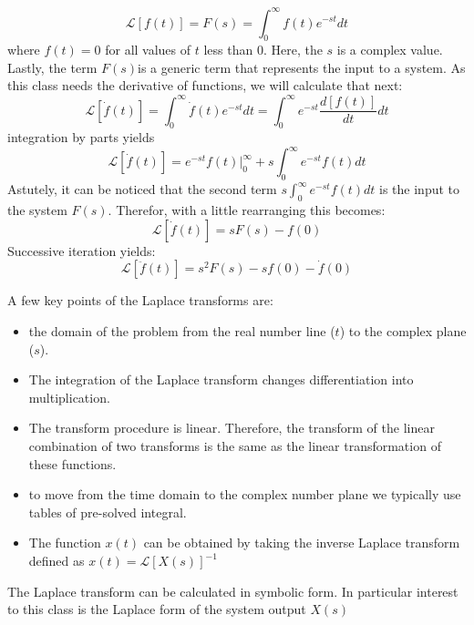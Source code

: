 \documentclass[12pt,letter]{article}
\numberwithin{ex}{section} %
\newcommand{\Laplace}[1]{\ensuremath{\mathcal{L}{\left[#1\right]}}}
\begin{document}
		\begin{equation}
				\Laplace{f(t)} = F(s) = \int_{0}^{\infty} f(t)e^{-st}dt
		\end{equation}
		where $f(t)=0$ for all values of $t$ less than 0. Here, the $s$ is a complex value. Lastly, the term $F(s)$is a generic term that  represents the input to a system. As this class needs the derivative of functions, we will calculate that next:
		\begin{equation}
			\Laplace{\dot{f}(t)} = \int_{0}^{\infty} \dot{f}(t)e^{-st}dt = \int_{0}^{\infty} e^{-st}\frac{d[f(t)]}{dt}dt 
		\end{equation}		
		integration by parts yields
		\begin{equation}
			\Laplace{\dot{f}(t)} = e^{-st}f(t)\Big|_0^\infty+s\int_{0}^{\infty}e^{-st}f(t)dt
		\end{equation}
		Astutely, it can be noticed that the second term $s\int_{0}^{\infty}e^{-st}f(t)dt$
		is the input to the system $F(s)$. Therefor, with a little rearranging this becomes:
		\begin{equation}
			\Laplace{\dot{f}(t)} = sF(s)-f(0)
		\end{equation}
		Successive iteration yields:
		\begin{equation}
			\Laplace{\ddot{f}(t)} = s^2F(s)-sf(0)-\dot{f}(0)
		\end{equation}
		
		A few key points of the Laplace transforms are:
		
		
		\begin{itemize}
			\item the domain of the problem from the real number line ($t$) to the complex plane ($s$).
			\item The integration of the Laplace transform changes differentiation into multiplication.
			\item The transform procedure is linear. Therefore, the transform of the linear combination of two transforms is the same as the linear transformation of these functions. 
			\item to move from the time domain to the complex number plane we typically use tables of pre-solved integral. 
			\item The function $x(t)$ can be obtained by taking the inverse Laplace transform defined as $x(t) = \Laplace{X(s)}^{-1}$
		\end{itemize}
		
		The Laplace transform can be calculated in symbolic form. In particular interest to this class is the Laplace form of the system output $X(s)$
\end{document}
